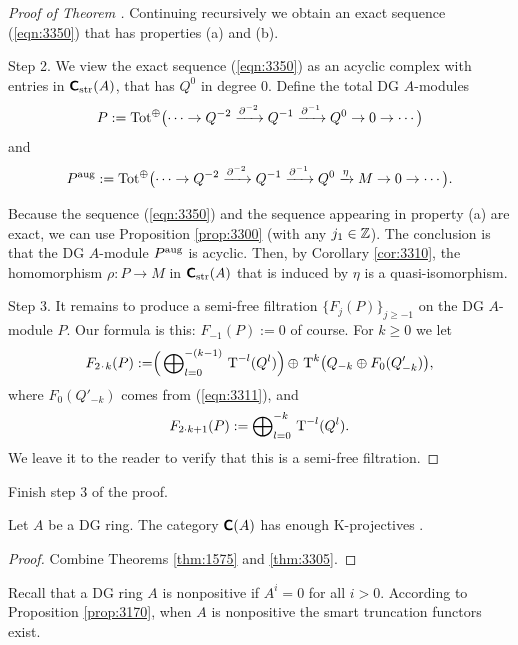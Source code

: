 \begin{proof}[Proof of Theorem \tup{\ref{thm:3305}}]
Continuing recursively we obtain an exact sequence (\ref{eqn:3350}) that has 
properties (a) and (b). 

\medskip \noindent 
Step 2. We view the exact sequence (\ref{eqn:3350}) as an acyclic complex with 
entries in $\boldsymbol{\mathsf{C}}_{\mathrm{str}}(A)$, that has $Q^0$ in degree $0$. 
Define the total DG $A$-modules 
\[ P :=\operatorname{Tot}^{\oplus} \bigl( 
\cdots \to Q^{-2} \xrightarrow{\partial^{-2}} Q^{-1} \xrightarrow{\partial^{-1}} Q^0 \to 0 \to \cdots
\bigr) \]
and 
\[ P^{\mathrm{aug}} := \operatorname{Tot}^{\oplus} \bigl(
\cdots \to Q^{-2} \xrightarrow{\partial^{-2}} Q^{-1} \xrightarrow{\partial^{-1}}
Q^0 \xrightarrow{\eta} M \to 0 \to \cdots \bigr) . \]

Because the sequence (\ref{eqn:3350}) and the sequence appearing in property 
(a) are exact, we can use Proposition \ref{prop:3300} (with any 
$j_1 \in \mathbb{Z}$). The conclusion is that the DG $A$-module $P^{\mathrm{aug}}$ is 
acyclic. Then, by Corollary \ref{cor:3310}, the homomorphism 
$\rho : P \to M$ in $\boldsymbol{\mathsf{C}}_{\mathrm{str}}(A)$
that is induced by $\eta$ is a quasi-isomorphism. 

\medskip \noindent
Step 3. It remains to produce a semi-free filtration 
$\{ F_j(P) \}_{j \geq -1}$ on the DG $A$-module $P$. Our formula is this: 
$F_{-1}(P) := 0$ of course. For $k \geq 0$ we let 
\[ F_{2 \mspace{1.5mu}{\cdot}\mspace{1.5mu} k}(P) := 
\Bigr( \bigoplus\nolimits_{l = 0}^{-(k - 1)} \, \operatorname{T}^{-l} (Q^l) \Bigl) 
\, \oplus \,   
\operatorname{T}^{k} \bigl( Q_{-k} \oplus F_0(Q'_{-k}) \bigr) , \]
where $F_0(Q'_{-k})$ comes from (\ref{eqn:3311}), and 
\[ F_{2 {\cdot} k + 1}(P)  := 
\bigoplus\nolimits_{l = 0}^{-k} \, \operatorname{T}^{-l} (Q^l) . \]
We leave it to the reader to verify that this is a semi-free filtration. 
\end{proof}

\begin{exer} \label{exer:4752}
Finish step 3 of the proof. 
\end{exer}

\begin{cor} \label{cor:1580}
Let $A$ be a DG ring. The category $\operatorname{\boldsymbol{\mathsf{C}}}(A)$ 
has enough K-pro\-jectives%
. 
\end{cor}

\begin{proof}
Combine Theorems \ref{thm:1575} and \ref{thm:3305}. 
\end{proof}

Recall that a DG ring $A$ is nonpositive if $A^i = 0$ for all $i > 0$.
According to Proposition \ref{prop:3170}, when $A$ is nonpositive the smart 
truncation functors exist. 

